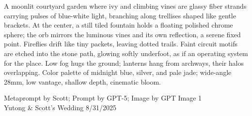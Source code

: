 \documentclass[12pt]{article}
\begin{document}
\noindent
\begin{adjustbox}{max size={\textwidth}{\textheight}}
\begin{varwidth}{\textwidth}
\RaggedRight
\footnotesize
A moonlit courtyard garden where ivy and climbing vines are glassy fiber strands carrying pulses of blue-white light, branching along trellises shaped like gentle brackets. At the center, a still tiled fountain holds a floating polished chrome sphere; the orb mirrors the luminous vines and its own reflection, a serene fixed point. Fireflies drift like tiny packets, leaving dotted trails. Faint circuit motifs are etched into the stone path, glowing softly underfoot, as if an operating system for the place. Low fog hugs the ground; lanterns hang from archways, their halos overlapping. Color palette of midnight blue, silver, and pale jade; wide-angle 28mm, low vantage, shallow depth, cinematic bloom.
\end{varwidth}
\end{adjustbox}
\vfill
{\raggedleft\footnotesize
Metaprompt by Scott; Prompt by GPT-5; Image by GPT Image 1 \\
Yutong \& Scott's Wedding 8/31/2025\par}
\end{document}
